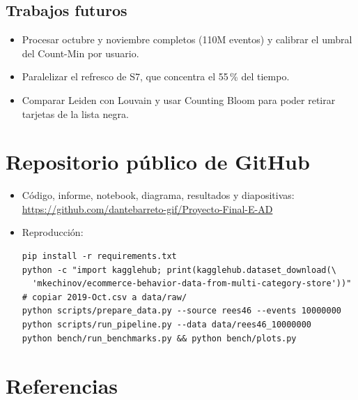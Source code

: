 \documentclass[11pt,letterpaper]{article}
\newcommand{\repo}{https://github.com/dantebarreto-gif/Proyecto-Final-E-AD}
\begin{document}
\subsection{Trabajos futuros}

\begin{itemize}
  \item Procesar octubre y noviembre completos (110M eventos) y calibrar el umbral del Count-Min por usuario.
  \item Paralelizar el refresco de S7, que concentra el 55\,\% del tiempo.
  \item Comparar Leiden con Louvain y usar Counting Bloom para poder retirar tarjetas de la lista negra.
\end{itemize}

\section*{Repositorio público de GitHub}

\begin{itemize}
  \item Código, informe, notebook, diagrama, resultados y diapositivas:\\ \url{\repo}
  \item Reproducción:
\begin{Verbatim}[fontsize=\footnotesize]
pip install -r requirements.txt
python -c "import kagglehub; print(kagglehub.dataset_download(\
  'mkechinov/ecommerce-behavior-data-from-multi-category-store'))"
# copiar 2019-Oct.csv a data/raw/
python scripts/prepare_data.py --source rees46 --events 10000000
python scripts/run_pipeline.py --data data/rees46_10000000
python bench/run_benchmarks.py && python bench/plots.py
\end{Verbatim}
\end{itemize}

\section*{Referencias}
\end{document}
